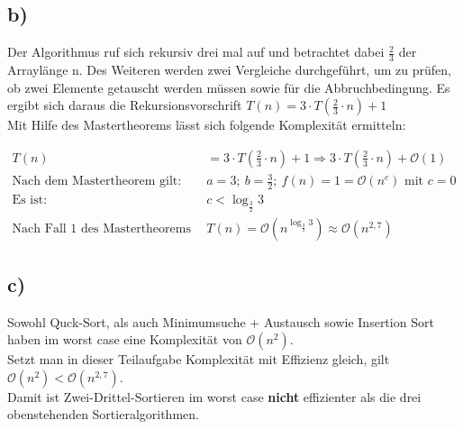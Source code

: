 \documentclass[a4paper]{scrartcl}
\begin{document}
\subsection*{b)}
Der Algorithmus ruf sich rekursiv drei mal auf und betrachtet dabei $\frac{2}{3}$ der Arraylänge n. Des Weiteren werden zwei Vergleiche durchgeführt, um zu prüfen, ob zwei Elemente getauscht werden müssen sowie für die Abbruchbedingung. Es ergibt sich daraus die Rekursionsvorschrift $T(n) = 3 \cdot T\left(\frac{2}{3} \cdot n\right) + 1$ \\
Mit Hilfe des Mastertheorems lässt sich folgende Komplexität ermitteln:

\begin{align*}
T(n) &= 3 \cdot T\left( \frac{2}{3} \cdot n \right) + 1 \Rightarrow 3 \cdot T\left(\frac{2}{3} \cdot n\right) + \mathcal{O}(1) \\
\text{Nach dem Mastertheorem gilt: } &a = 3; ~ b = \frac{3}{2}; ~ f(n) = 1 = \mathcal{O}(n^c) \text{ mit } c = 0 \\
\text{Es ist: } &c < \log_{\frac{3}{2}} 3 \\
\text{Nach Fall 1 des Mastertheorems gilt: } &T(n) = \mathcal{O}(n^{\log_{\frac{3}{2}} 3}) \approx \mathcal{O}(n^{2,7})
\end{align*}

\subsection*{c)}
Sowohl Quck-Sort, als auch Minimumsuche $+$ Austausch sowie Insertion Sort haben im worst case eine Komplexität von $\mathcal{O}(n^{2})$. \\
Setzt man in dieser Teilaufgabe Komplexität mit Effizienz gleich, gilt $\mathcal{O}(n^{2}) < \mathcal{O}(n^{2,7})$. \\
Damit ist Zwei-Drittel-Sortieren im worst case \textbf{nicht} effizienter als die drei obenstehenden Sortieralgorithmen.
\end{document}
